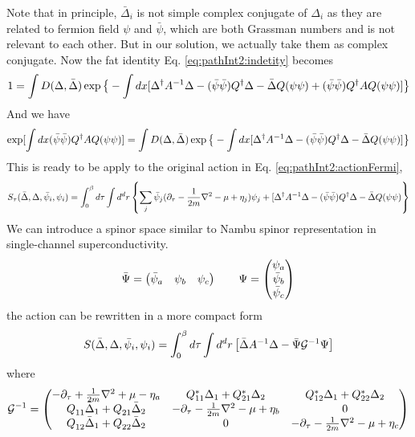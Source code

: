 Note that in principle, $\bar{\Delta}_{i}$ is not simple complex conjugate of $\Delta_{i}$ as they are related to fermion field $\psi$ and $\bar\psi$, which are both Grassman numbers and is not relevant to each other.  But in our solution, we actually take them as complex conjugate.  Now the fat identity Eq. \ref{eq:pathInt2:indetity} becomes 
\begin{equation}
1=\int{D(\Delta,\bar\Delta)}\exp\big\{-\int{dx}
	[\Delta^{\dagger}A^{-1}\Delta-(\bar\psi\bar\psi)Q^{\dagger}\Delta-\bar\Delta{Q}(\psi\psi)+(\bar\psi\bar\psi)Q^{\dagger}AQ(\psi\psi)]\big\}
\end{equation}
And we have 
\begin{equation}
\exp[\int{dx}(\bar\psi\bar\psi)Q^{\dagger}AQ(\psi\psi)]
=\int{D(\Delta,\bar\Delta)}\exp\big\{-\int{dx}
	[\Delta^{\dagger}A^{-1}\Delta-(\bar\psi\bar\psi)Q^{\dagger}\Delta-\bar\Delta{Q}(\psi\psi)]\big\}
\end{equation}
This is ready to be apply to the original action in Eq. \ref{eq:pathInt2:actionFermi}, 
\begin{equation}\label{eq:pathInt2:actionMix}
S_{\tau}(\bar\Delta,\Delta,\bar\psi_{i},\psi_{i})=\int^{\beta}_{0}d\tau\int{d^{d}r}\left\{\sum_{j}\bar\psi_{j}(\partial_\tau-\frac{1}{2m}\nabla^{2}-\mu+\eta_{j})\psi_{j}
+[\Delta^{\dagger}A^{-1}\Delta-(\bar\psi\bar\psi)Q^{\dagger}\Delta-\bar\Delta{Q}(\psi\psi)\right\}
\end{equation}
We can introduce a spinor space similar to Nambu spinor representation in single-channel superconductivity.  
\begin{equation}
\bar\Psi=\begin{pmatrix}\bar\psi_{a}&\psi_{b}&\psi_{c}\end{pmatrix}\qquad\Psi=\begin{pmatrix}\psi_{a}\\\bar\psi_{b}\\\bar\psi_{c}\end{pmatrix}
\end{equation}
the action can be rewritten in a more compact form
\begin{equation}\label{eq:pathInt2:actionMix}
S(\bar\Delta,\Delta,\bar\psi_{i},\psi_{i})=\int^{\beta}_{0}d\tau\int{d^{d}r}
	\left[\bar\Delta{}A^{-1}\Delta-\bar\Psi\mathcal{G}^{-1}\Psi\right]
\end{equation}
where 
\begin{equation}
\mathcal{G}^{-1}=
\begin{pmatrix}
-\partial_{\tau}+\frac{1}{2m}\nabla^{2}+\mu-\eta_{a}&Q^{*}_{11}\Delta_{1}+Q^{*}_{21}\Delta_{2}&Q^{*}_{12}\Delta_{1}+Q^{*}_{22}\Delta_{2}\\
Q^{}_{11}\bar\Delta_{1}+Q^{}_{21}\bar\Delta_{2}&-\partial_{\tau}-\frac{1}{2m}\nabla^{2}-\mu+\eta_{b}&0\\
Q^{}_{12}\bar\Delta_{1}+Q^{}_{22}\bar\Delta_{2}&0&-\partial_{\tau}-\frac{1}{2m}\nabla^{2}-\mu+\eta_{c}
\end{pmatrix}
\end{equation}
